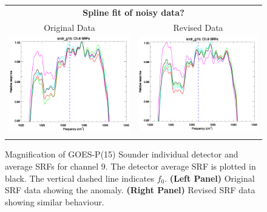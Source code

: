 \begin{figure}[htp]
  \centering
  \begin{tabular}{c c}
    \multicolumn{2}{c}{\textsf{\bfseries Spline fit of noisy data?}} \\
    \hspace{1.5em}\textsf{Original Data} &
    \hspace{1.5em}\textsf{Revised Data} \\
    \includegraphics[scale=0.5,trim=0 40 0 0]{graphics/zoom_anomaly/original/sndr_g15.ch9.srf.eps} &
    \includegraphics[scale=0.5,trim=0 40 0 0]{graphics/zoom_anomaly/revised/sndr_g15.ch9.srf.eps} \\\\
  \end{tabular}
  \caption{Magnification of GOES-P(15) Sounder individual detector and average SRFs for channel 9. The detector average SRF is plotted in black. The vertical dashed line indicates $f_0$. \textbf{(Left Panel)} Original SRF data showing the anomaly. \textbf{(Right Panel)} Revised SRF data showing similar behaviour.}
  \label{fig:sndr_g15.ch9.anomaly}
\end{figure}


